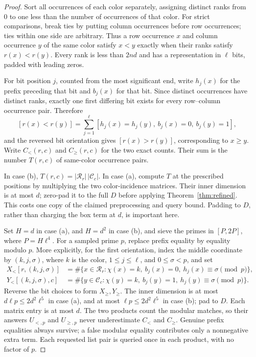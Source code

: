 \documentclass[11pt]{article}
\begin{document}
\begin{proof}
Sort all occurrences of each color separately, assigning distinct ranks
from $0$ to one less than the number of occurrences of that color. For
strict comparisons, break ties by putting column occurrences before row
occurrences; ties within one side are arbitrary. Thus a row occurrence
$x$ and column occurrence $y$ of the same color satisfy $x<y$ exactly
when their ranks satisfy $r(x)<r(y)$. Every rank is less than $2nd$ and
has a representation in $\ell$ bits, padded with leading zeros.

For bit position $j$, counted from the most significant end, write
$h_j(x)$ for the prefix preceding that bit and $b_j(x)$ for that bit.
Since distinct occurrences have distinct ranks, exactly one first
differing bit exists for every row--column occurrence pair. Therefore
\[
[r(x)<r(y)]=\sum_{j=1}^{\ell}
[h_j(x)=h_j(y),\ b_j(x)=0,\ b_j(y)=1],
\]
and the reversed bit orientation gives $[r(x)>r(y)]$, corresponding to
$x\ge y$. Write $C_<(r,c)$ and $C_{\ge}(r,c)$ for the two exact counts.
Their sum is the number $T(r,c)$ of same-color occurrence pairs.

In case (b), $T(r,c)=|\mathcal R_r|\,|\mathcal C_c|$. In case (a), compute
$T$ at the prescribed positions by multiplying the two color-incidence
matrices. Their inner dimension is at most $d$; zero-pad it to the full
$D$ before applying Theorem~\ref{thm:refined}. This costs one copy of
the claimed preprocessing and query bound. Padding to $D$, rather than
charging the box term at $d$, is important here.

Set $H=d$ in case (a), and $H=d^2$ in case (b), and sieve the primes in
$[P,2P]$, where $P=H\ell^4$. For a sampled prime $p$, replace prefix
equality by equality modulo $p$. More explicitly, for the first
orientation, index the middle coordinate by $(k,j,\sigma)$, where $k$
is the color, $1\le j\le\ell$, and $0\le\sigma<p$, and set
\begin{align*}
X_<[r,(k,j,\sigma)]
 &=\#\{x\in\mathcal R_r:\chi(x)=k,\ b_j(x)=0,
                         \ h_j(x)\equiv\sigma\pmod p\},\\
Y_<[(k,j,\sigma),c]
 &=\#\{y\in\mathcal C_c:\chi(y)=k,\ b_j(y)=1,
                         \ h_j(y)\equiv\sigma\pmod p\}.
\end{align*}
Reverse the bit choices to form $X_{\ge},Y_{\ge}$. The inner dimension
is at most $d\ell p\le2d^2\ell^5$ in case (a), and at most
$\ell p\le2d^2\ell^5$ in case (b); pad to $D$. Each matrix entry is
at most $d$. The two products count the modular matches, so their
answers $U_{<,p}$ and $U_{\ge,p}$ never underestimate $C_<$ and
$C_{\ge}$. Genuine prefix equalities always survive; a false modular
equality contributes only a nonnegative extra term. Each requested
list pair is queried once in each product, with no factor of $p$.


\end{proof}
\end{document}
